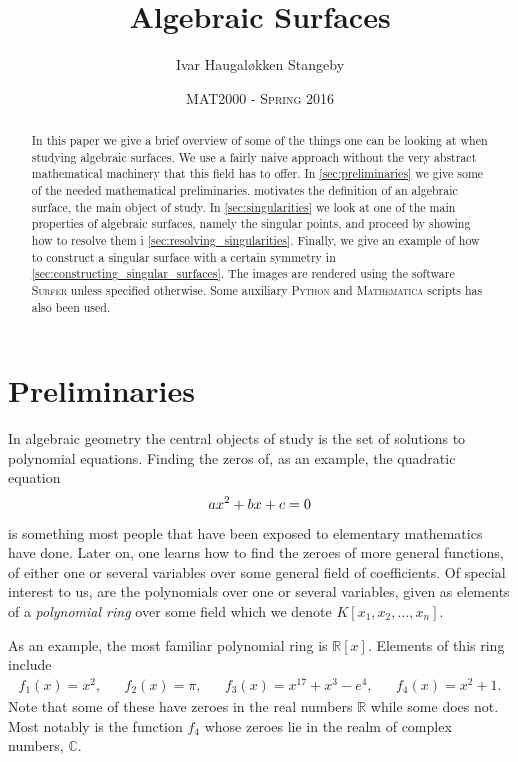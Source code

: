 \documentclass{article}
\title{Algebraic Surfaces}
\author{Ivar Haugal{\o}kken Stangeby}
\date{\textsc{MAT2000 - Spring 2016}}
\newcommand{\R}{\ensuremath{\mathbb{R}}}
\newcommand{\C}{\ensuremath{\mathbb{C}}}
\begin{document}
    \maketitle

    \begin{abstract}
       In this paper we give a brief overview of some of the things one can be
       looking at when studying algebraic surfaces. We use a fairly naive
       approach without the very abstract mathematical machinery that this
       field has to offer. In \cref{sec:preliminaries} we give some of the
       needed mathematical preliminaries.  motivates the
       definition of an algebraic surface, the main object of study. In
       \cref{sec:singularities} we look at one of the main properties of
       algebraic surfaces, namely the singular points, and proceed by showing
       how to resolve them i \cref{sec:resolving_singularities}. Finally, we
       give an example of how to construct a singular surface with a certain
       symmetry in \cref{sec:constructing_singular_surfaces}.  The images are
       rendered using the software \textsc{Surfer} unless specified otherwise.
       Some auxiliary \textsc{Python} and \textsc{Mathematica} scripts has also
       been used. 
    \end{abstract}

    \tableofcontents
             
    \section{Preliminaries}
    \label{sec:preliminaries}
    
    In algebraic geometry the central objects of study is the set of solutions
    to polynomial equations. Finding the zeros of, as an example, the quadratic
    equation
    \begin{equation}
        \notag
        ax^2 + bx + c = 0
    \end{equation}
    is something most people that have been exposed to elementary mathematics
    have done. Later on, one learns how to find the zeroes of more general
    functions, of either one or several variables over some general field of
    coefficients. Of special interest to us, are the polynomials over one or
    several variables, given as elements of a \emph{polynomial ring} over some
    field which we denote $K[x_1, x_2, \ldots, x_n]$.

    As an example, the most familiar polynomial ring is $\R[x]$. Elements of
    this ring include
    \begin{align*}
        f_1(x) = x^2, && f_2(x) = \pi, && f_3(x) = x^{17} + x^{3} - e^{4}, && f_4(x) = x^2 + 1.
    \end{align*} 
    Note that some of these have zeroes in the real numbers $\R$ while some
    does not. Most notably is the function $f_4$ whose zeroes lie in the realm
    of complex numbers, $\C$.
\end{document}
